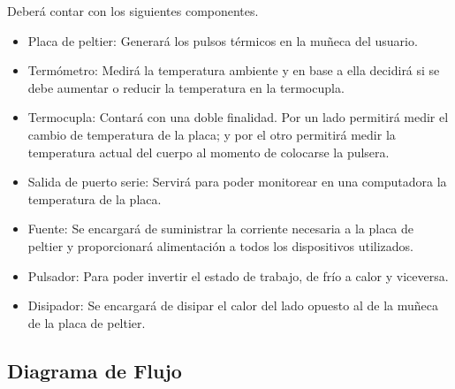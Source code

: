 \documentclass[10pt,spanish,a4paper,openany,notitlepage]{article}
\begin{document}
Deberá contar con los siguientes componentes.

\begin{itemize}
\item{Placa de peltier:} Generará los pulsos térmicos en la muñeca del usuario.
\item{Termómetro:} Medirá la temperatura ambiente y en base a ella decidirá 
si se debe aumentar o reducir la temperatura en la termocupla.
\item{Termocupla:} Contará con una doble finalidad. Por un lado permitirá 
medir el cambio de temperatura de la placa; y por el otro permitirá medir 
la temperatura actual del cuerpo al momento de colocarse la pulsera.
\item{Salida de puerto serie:} Servirá para poder monitorear en una 
computadora la temperatura de la placa.
\item{Fuente:} Se encargará de suministrar la corriente necesaria a la 
placa de peltier y proporcionará alimentación a todos los dispositivos utilizados.
\item{Pulsador:} Para poder invertir el estado de trabajo, de frío a calor 
y viceversa.
\item{Disipador:} Se encargará de disipar el calor del lado opuesto al de 
la muñeca de la placa de peltier.
\end{itemize}

\subsection{Diagrama de Flujo}
\end{document}
